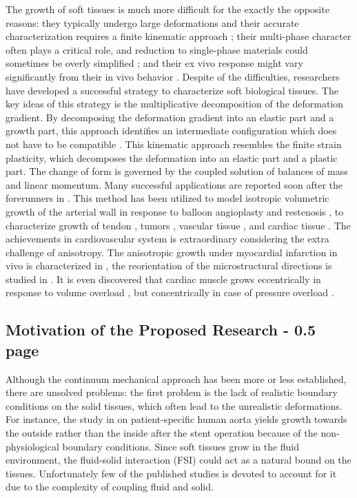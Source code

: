\documentclass[12pt]{article}
\begin{document}
The growth of soft tissues is much more difficult for the exactly the opposite reasons: they typically undergo large deformations and their accurate characterization requires a finite kinematic approach \cite{Rodriguez}; their multi-phase character often plays a critical role, and reduction to single-phase materials could sometimes be overly simplified \cite{Mow}; and their ex vivo response might vary significantly from their in vivo behavior \cite{Krishnamurthy}. Despite of the difficulties, researchers have developed a successful strategy to characterize soft biological tissues. The key ideas of this strategy is the multiplicative decomposition of the deformation gradient. By decomposing the deformation gradient into an elastic part and a growth part, this approach identifies an intermediate configuration which does not have to be compatible \cite{Goriely, Menzel2, Rodriguez}. This kinematic approach resembles the finite strain plasticity, which decomposes the deformation into an elastic part and a plastic part. The change of form is governed by the coupled solution of balances of mass and linear momentum. Many successful applications are reported soon after the forerunners in \cite{Hsu, Skalak}. This method has been utilized to model isotropic volumetric growth of the arterial wall in response to balloon angioplasty and restenosis \cite{Himpel, Kuhl3}, to characterize growth of tendon \cite{Garikipati2}, tumors \cite{Ambrosi2}, vascular tissue \cite{Humphrey2, Humphrey3, Taber}, and cardiac tissue \cite{Kroon, Goktepe}. The achievements in cardiovascular system is extraordinary considering the extra challenge of anisotropy. The anisotropic growth under myocardial infarction in vivo is characterized in \cite{Tsamis}, the reorientation of the microstructural directions is studied in \cite{Kuhl4, Kuhl5}. It is even discovered that cardiac muscle grows eccentrically in response to volume overload \cite{Goktepe2}, but concentrically in case of pressure overload \cite{Rausch}.

\subsection{Motivation of the Proposed Research - 0.5 page}
Although the continuum mechanical approach has been more or less established, there are unsolved problems:
the first problem is the lack of realistic boundary conditions on the solid tissues, which often lead to the unrealistic deformations. For instance, the study in \cite{Kuhl3} on patient-specific human aorta yields growth towards the outside rather than the inside after the stent operation because of the non-physiological boundary conditions. Since soft tissues grow in the fluid environment, the fluid-solid interaction (FSI) could act as a natural bound on the tissues. Unfortunately few of the published studies is devoted to account for it due to the complexity of coupling fluid and solid.
\end{document}
